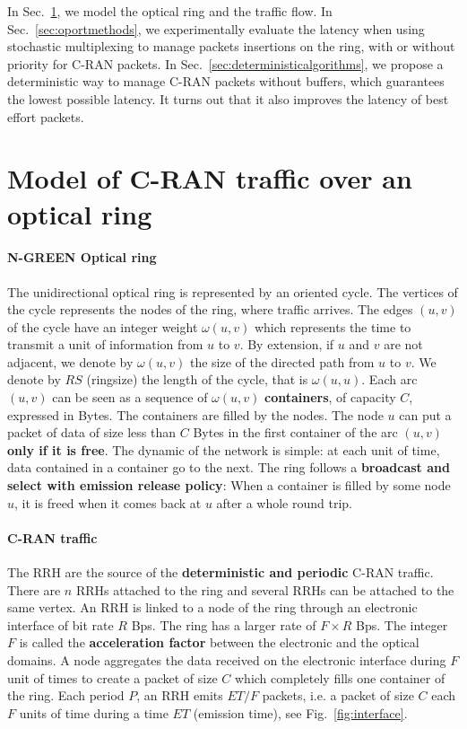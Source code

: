 \documentclass[]{algotel}
\begin{document}
In Sec.~\ref{sec:model}, we model the optical ring and the traffic flow. In Sec.~\ref{sec:oportmethods}, we experimentally evaluate the latency when using stochastic multiplexing to manage packets insertions on the ring, with or without priority for C-RAN packets. In Sec.~\ref{sec:deterministicalgorithms}, we propose a deterministic way to manage C-RAN packets without buffers, which guarantees the lowest possible latency. It turns out that it also improves the latency of best effort packets.

\section{Model of C-RAN traffic over an optical ring}
\label{sec:model}
    
  \paragraph{N-GREEN Optical ring}
   
  The unidirectional optical ring is represented by an oriented cycle. The vertices of the cycle represents the nodes of the ring, where traffic arrives. The edges $(u,v)$ of the cycle have an integer weight $\omega(u,v)$ which represents the time to transmit a unit of information from $u$ to $v$. By extension, if $u$ and $v$ are not adjacent, we denote by $\omega(u,v)$ the size of the directed path from $u$ to $v$.  We denote by $RS$ (ringsize) the length of the cycle, that is $\omega(u,u)$.  Each arc $(u,v)$ can be seen as a sequence of $\omega(u,v)$ {\bf containers}, of capacity $C$, expressed in Bytes.  The containers are filled by the nodes. The node $u$ can put a packet of data of size less than $C$ Bytes in the first container of the arc $(u,v)$ {\bf only if it is free}. 
  The dynamic of the network is simple: at each unit of time, data contained in a container go to the next.
   The ring follows a {\bf broadcast and select with emission release policy}: When a container is filled by some node $u$,
   it is freed when it comes back at $u$ after a whole round trip.

   \paragraph{C-RAN traffic}
   
   The RRH are the source of the {\bf deterministic and periodic} C-RAN traffic.
   There are $n$ RRHs attached to the ring and several RRHs can be attached to the same vertex. An RRH is linked to a node of the ring through an electronic interface of bit rate $R$ Bps.
   The ring has a larger rate of $F\times R$ Bps. The integer $F$ is called the {\bf acceleration factor} between the electronic and the optical domains. A node aggregates the data received on the electronic interface during $F$ unit of times to create a packet of size $C$ which completely fills one container of the ring. Each period $P$, an RRH emits $ET / F$ packets, i.e. a packet of size $C$ each $F$ units of time during a time $ET$ (emission time), see Fig.~\ref{fig:interface}.
   
\end{document}
